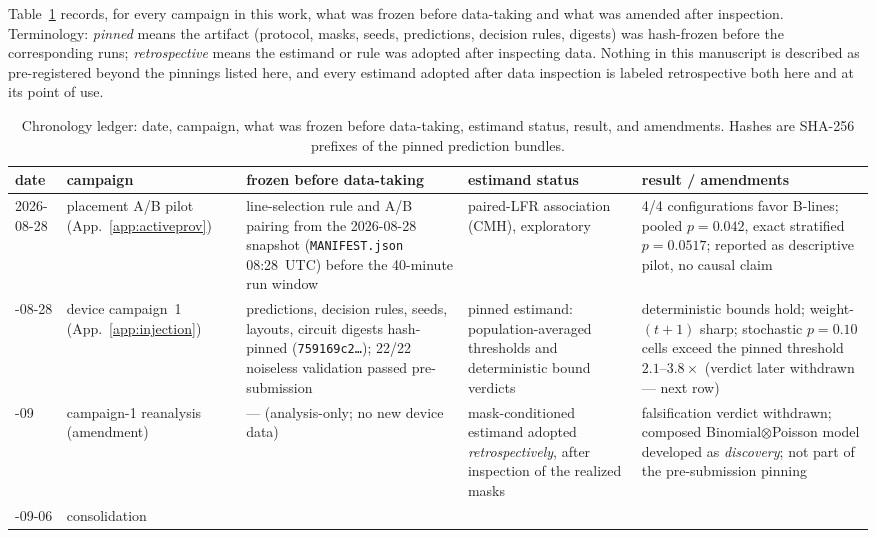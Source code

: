 \documentclass[11pt,a4paper]{article}
\begin{document}
Table~\ref{tab:chronology} records, for every campaign in this work,
what was frozen before data-taking and what was amended after
inspection. Terminology: \emph{pinned} means the artifact (protocol,
masks, seeds, predictions, decision rules, digests) was hash-frozen
before the corresponding runs; \emph{retrospective} means the estimand
or rule was adopted after inspecting data. Nothing in this manuscript is
described as pre-registered beyond the pinnings listed here, and every
estimand adopted after data inspection is labeled retrospective both
here and at its point of use.

\begin{table}[H]\centering\scriptsize
\caption{Chronology ledger: date, campaign, what was frozen before
  data-taking, estimand status, result, and amendments. Hashes are
  SHA-256 prefixes of the pinned prediction bundles.}
\label{tab:chronology}
\setlength{\tabcolsep}{4pt}
\begin{tabular}{@{}p{1.4cm}p{2.7cm}p{3.8cm}p{3.2cm}p{3.4cm}@{}}
\toprule
date & campaign & frozen before data-taking & estimand status &
result / amendments \\\midrule
2026-08-28 & placement A/B pilot
  (App.~\ref{app:activeprov})
  & line-selection rule and A/B pairing from the 2026-08-28 snapshot
    (\texttt{MANIFEST.json} 08:28~UTC) before the 40-minute run window
  & paired-LFR association (CMH), exploratory
  & 4/4 configurations favor B-lines; pooled $p{=}0.042$, exact
    stratified $p{=}0.0517$; reported as descriptive pilot, no causal
    claim \\\addlinespace
2026-08-28 & device campaign~1
  (App.~\ref{app:injection})
  & predictions, decision rules, seeds, layouts, circuit digests
    hash-pinned (\texttt{759169c2\dots}); 22/22 noiseless validation
    passed pre-submission
  & pinned estimand: population-averaged thresholds and deterministic
    bound verdicts
  & deterministic bounds hold; weight-$(t{+}1)$ sharp; stochastic
    $p{=}0.10$ cells exceed the pinned threshold $2.1$--$3.8\times$
    (verdict later withdrawn --- next row) \\\addlinespace
2026-09 & campaign-1 reanalysis (amendment)
  & --- (analysis-only; no new device data)
  & mask-conditioned estimand adopted \emph{retrospectively}, after
    inspection of the realized masks
  & falsification verdict withdrawn; composed Binomial$\otimes$Poisson
    model developed as \emph{discovery}; not part of the pre-submission
    pinning \\\addlinespace
2026-09-06 & consolidation

\end{tabular}
\end{table}
\end{document}
